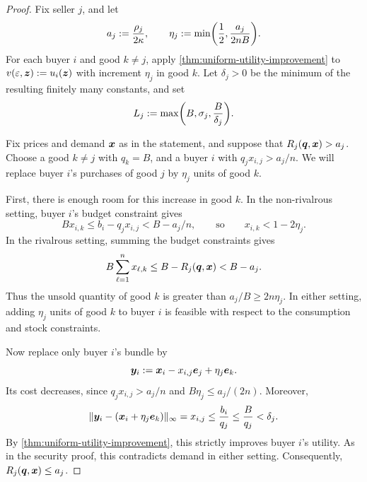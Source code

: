 \thmOverpricing*
\begin{proof}
Fix seller $j$, and let
\[ a_j := \frac{\rho_j}{2\kappa}, \qquad
   \eta_j := \min\biggl(\frac{1}{2}, \frac{a_j}{2nB}\biggr). \]
For each buyer $i$ and good $k \ne j$, apply \cref{thm:uniform-utility-improvement}
to $v(\varepsilon, \bm{z}) := u_i(\bm{z})$ with increment $\eta_j$ in good $k$.
Let $\delta_j > 0$ be the minimum of the resulting finitely many constants, and set
\[ L_j := \max\biggl(B, \sigma_j, \frac{B}{\delta_j}\biggr). \]

Fix prices and demand $\bm{x}$ as in the statement, and suppose that
$R_j(\bm{q}, \bm{x}) > a_j$.
Choose a good $k \ne j$ with $q_k = B$, and a buyer $i$ with
$q_jx_{i, j} > a_j/n$.
We will replace buyer $i$'s purchases of good $j$ by $\eta_j$ units of good $k$.

First, there is enough room for this increase in good $k$.
In the non-rivalrous setting, buyer $i$'s budget constraint gives
\[ Bx_{i, k} \le b_i - q_jx_{i, j} < B - a_j/n,
    \qquad \text{so} \qquad x_{i, k} < 1 - 2\eta_j. \]
In the rivalrous setting, summing the budget constraints gives
\[ B \sum_{\ell = 1}^n x_{\ell, k}
    \le B - R_j(\bm{q}, \bm{x}) < B - a_j. \]
Thus the unsold quantity of good $k$ is greater than $a_j/B \ge 2n\eta_j$.
In either setting, adding $\eta_j$ units of good $k$ to buyer $i$ is feasible
with respect to the consumption and stock constraints.

Now replace only buyer $i$'s bundle by
\[ \bm{y}_i := \bm{x}_i - x_{i, j}\bm{e}_j + \eta_j\bm{e}_k. \]
Its cost decreases, since $q_jx_{i, j} > a_j/n$ and $B\eta_j \le a_j/(2n)$.
Moreover,
\[ \lVert \bm{y}_i - (\bm{x}_i + \eta_j\bm{e}_k) \rVert_\infty
    = x_{i, j} \le \frac{b_i}{q_j} \le \frac{B}{q_j} < \delta_j. \]
By \cref{thm:uniform-utility-improvement}, this strictly improves buyer $i$'s utility.
As in the security proof, this contradicts demand in either setting.
Consequently, $R_j(\bm{q}, \bm{x}) \le a_j$.
\end{proof}

